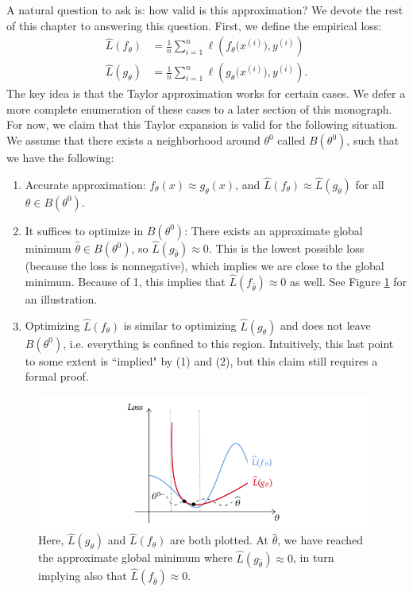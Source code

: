 A natural question to ask is: how valid is this approximation? We devote the rest of this chapter to answering this question. First, we define the empirical loss: 
\begin{align}
    \hat{L}(f_\theta) & = \frac{1}{n}\sum_{i=1}^n \ell \left( f_\theta\big( x^{(i)} \big) , y^{(i)} \right) \\ 
    \hat{L}(g_\theta) & = \frac{1}{n}\sum_{i=1}^n \ell \left( g_\theta\big( x^{(i)} \big) , y^{(i)} \right).
\end{align} 
The key idea is that the Taylor approximation works for certain cases. We defer a more complete enumeration of these cases to a later section of this monograph. For now, we claim that this Taylor expansion is valid for the following situation. 
 We assume  that there exists a neighborhood around $\theta^0$ called $B(\theta^0)$, such that we have the following:
\begin{enumerate}
    \item Accurate approximation: $f_\theta(x) \approx g_\theta(x)$, and $\hat{L}(f_\theta) \approx \hat{L}(g_\theta)$ for all $\theta \in B(\theta^0)$.
    \item It suffices to optimize in $B(\theta^0)$: There exists an approximate global minimum $\hat{\theta} \in B(\theta^0)$, so $\hat{L}(g_{\hat{\theta}}) \approx 0$. This is the lowest possible loss (because the loss is nonnegative), which implies we are close to the global minimum. Because of 1, this implies that $\hat{L}(f_{\hat{\theta}}) \approx 0$ as well. See Figure \ref{fig:ntkglobalmin} for an illustration.
    \item Optimizing $\hat{L} (f_\theta)$ is similar to optimizing $\hat{L}(g_\theta)$ and does not leave $B(\theta^0)$, i.e. everything is confined to this region. Intuitively, this last point to some extent is ``implied" by (1) and (2), but this claim still requires a formal proof. 
\end{enumerate}

\begin{figure}[h!]
    \centering
    \includegraphics[scale=0.5]{figures/ntk_global_min.png}
    \caption{Here, $\hat{L}(g_{\theta})$ and $\hat{L}(f_{\theta})$ are both plotted. At $\hat{\theta}$, we have reached the approximate global minimum where $\hat{L}(g_{\hat{\theta}}) \approx 0$, in turn implying also that $\hat{L}(f_{\hat{\theta}}) \approx 0$.}
    \label{fig:ntkglobalmin}
\end{figure}

